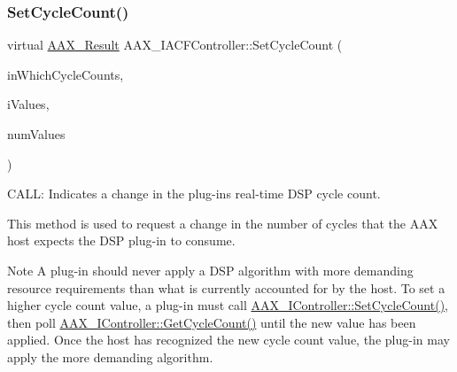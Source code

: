 \subsubsection{\texorpdfstring{SetCycleCount()}{SetCycleCount()}}
{\footnotesize\ttfamily virtual \mbox{\hyperlink{a00392_a4d8f69a697df7f70c3a8e9b8ee130d2f}{A\+A\+X\+\_\+\+Result}} A\+A\+X\+\_\+\+I\+A\+C\+F\+Controller\+::\+Set\+Cycle\+Count (\begin{DoxyParamCaption}\item[{\mbox{\hyperlink{a00662_a13e384f22825afd3db6d68395b79ce0d}{A\+A\+X\+\_\+\+E\+Property}} $\ast$}]{in\+Which\+Cycle\+Counts,  }\item[{\mbox{\hyperlink{a00392_ab247c0d8686c14e05cbb567ef276f249}{A\+A\+X\+\_\+\+C\+Property\+Value}} $\ast$}]{i\+Values,  }\item[{int32\+\_\+t}]{num\+Values }\end{DoxyParamCaption})\hspace{0.3cm}{\ttfamily [pure virtual]}}



C\+A\+LL\+: Indicates a change in the plug-\/in\textquotesingle{}s real-\/time D\+SP cycle count. 

This method is used to request a change in the number of cycles that the A\+AX host expects the D\+SP plug-\/in to consume.

\begin{DoxyNote}{Note}
A plug-\/in should never apply a D\+SP algorithm with more demanding resource requirements than what is currently accounted for by the host. To set a higher cycle count value, a plug-\/in must call \mbox{\hyperlink{a01789_a1a654f682357d48bafd506cbbea2ae25}{A\+A\+X\+\_\+\+I\+Controller\+::\+Set\+Cycle\+Count()}}, then poll \mbox{\hyperlink{a01789_a26e009667f9cd6c3cccd45b862108bf4}{A\+A\+X\+\_\+\+I\+Controller\+::\+Get\+Cycle\+Count()}} until the new value has been applied. Once the host has recognized the new cycle count value, the plug-\/in may apply the more demanding algorithm.
\end{DoxyNote}

